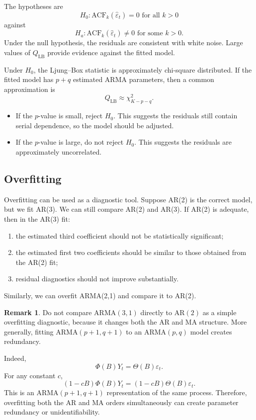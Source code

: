 \documentclass[12pt,oneside]{book}
\numberwithin{equation}{section}
\theoremstyle{definition}
\newtheorem{remark}{Remark}[section]
\theoremstyle{plain}
\theoremstyle{remark}
\begin{document}
The hypotheses are
\[
H_0:\mathrm{ACF}_k(\widehat{\varepsilon}_t)=0
\text{ for all } k>0
\]
against
\[
H_a:\mathrm{ACF}_k(\widehat{\varepsilon}_t)\neq 0
\text{ for some } k>0.
\]
Under the null hypothesis, the residuals are consistent with white noise. Large values of $Q_{\mathrm{LB}}$ provide evidence against the fitted model.

Under $H_0$, the Ljung--Box statistic is approximately chi-square distributed. If the fitted model has $p+q$ estimated ARMA parameters, then a common approximation is
\[
Q_{\mathrm{LB}}
\approx
\chi^2_{K-p-q}.
\]

\begin{itemize}
\item If the $p$-value is small, reject $H_0$. This suggests the residuals still contain serial dependence, so the model should be adjusted.
\item If the $p$-value is large, do not reject $H_0$. This suggests the residuals are approximately uncorrelated.
\end{itemize}

\subsection{Overfitting}

Overfitting can be used as a diagnostic tool. Suppose AR(2) is the correct model, but we fit AR(3). We can still compare AR(2) and AR(3). If AR(2) is adequate, then in the AR(3) fit:

\begin{enumerate}
\item the estimated third coefficient should not be statistically significant;
\item the estimated first two coefficients should be similar to those obtained from the AR(2) fit;
\item residual diagnostics should not improve substantially.
\end{enumerate}

Similarly, we can overfit ARMA(2,1) and compare it to AR(2).

\begin{remark}
Do not compare ARMA$(3,1)$ directly to AR$(2)$ as a simple overfitting diagnostic, because it changes both the AR and MA structure. More generally, fitting ARMA$(p+1,q+1)$ to an ARMA$(p,q)$ model creates redundancy.
\end{remark}

Indeed,
\[
\Phi(B)Y_t=\Theta(B)\varepsilon_t.
\]
For any constant $c$,
\[
(1-cB)\Phi(B)Y_t=(1-cB)\Theta(B)\varepsilon_t.
\]
This is an ARMA$(p+1,q+1)$ representation of the same process. Therefore, overfitting both the AR and MA orders simultaneously can create parameter redundancy or unidentifiability.
\end{document}
